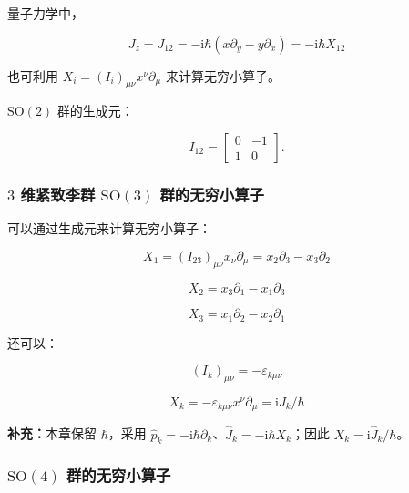 量子力学中，

\begin{equation}
J_z=J_{12}=-\mathrm{i}\hbar\left(x\partial_y-y\partial_x \right)=-\mathrm{i}\hbar X_{12}
\end{equation}

也可利用 $X_i=\left(I_i \right)_{\mu\nu} x^{\nu} \partial_\mu$ 来计算无穷小算子。

$\mathrm{SO}\left(2\right)$ 群的生成元：

\begin{equation}
I_{12}=\begin{bmatrix}0&-1\\1&0\end{bmatrix}.
\end{equation}

\subsubsection*{\texorpdfstring{$3$ 维紧致李群 $\mathrm{SO}\left(3\right)$ 群的无穷小算子}{3 维紧致李群 SO(3) 群的无穷小算子}}

可以通过生成元来计算无穷小算子：

\begin{equation}
X_1
=\left(I_{23} \right)_{\mu\nu}x_\nu\partial_\mu
=x_2\partial_3-x_3\partial_2
\end{equation}

\begin{equation}
X_2
=x_3\partial_1-x_1\partial_3
\end{equation}

\begin{equation}
X_3
=x_1\partial_2-x_2\partial_1
\end{equation}

还可以：

\begin{equation}
\left(I_k \right)_{\mu\nu}
=-\varepsilon_{k\mu\nu}
\end{equation}

\begin{equation}
X_k
=-\varepsilon_{k\mu\nu} x^{\nu} \partial_\mu
=\mathrm{i}J_k/\hbar
\end{equation}

\textbf{补充：}本章保留 $\hbar$，采用 $\hat p_k=-\mathrm{i}\hbar\partial_k$、$\hat J_k=-\mathrm{i}\hbar X_k$；因此 $X_k=\mathrm{i}\hat J_k/\hbar$。

\subsubsection*{\texorpdfstring{$\mathrm{SO}\left(4\right)$ 群的无穷小算子}{SO(4) 群的无穷小算子}}

